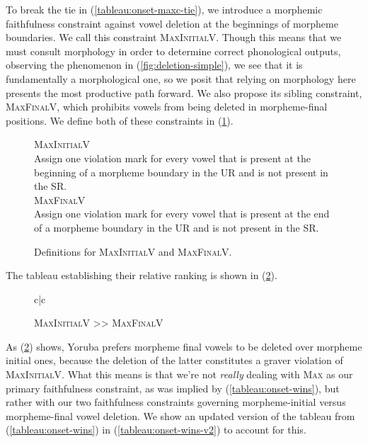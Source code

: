 \documentclass[12pt]{article}
\newcommand{\maxvplus}{\textsc{MaxFinalV}}
\newcommand{\maxplusv}{\textsc{MaxInitialV}}
\newcommand{\maxc}{\textsc{Max}}
\newcommand{\pref}[1]{(\ref{#1})}
\begin{document}
To break the tie in \pref{tableau:onset-maxc-tie}, we introduce a morphemic
faithfulness constraint against vowel deletion at the beginnings of morpheme
boundaries. We call this constraint \maxplusv. Though this means that we must
consult morphology in order to determine correct phonological outputs,
observing the phenomenon in \pref{fig:deletion-simple}, we see that it is
fundamentally a morphological one, so we posit that relying on morphology here
presents the most productive path forward. We also propose its sibling
constraint, \maxvplus, which prohibits vowels from being deleted in
morpheme-final positions. We define both of these constraints in
\pref{def:maxvplus-and-maxplusv}.


\begin{figure}[h]
    \caption{Definitions for \maxplusv{} and \maxvplus.}
    \label{def:maxvplus-and-maxplusv}
    \begin{center}
        \maxplusv\\
        Assign one violation mark for every vowel that is present at the
        beginning of a morpheme boundary in the UR and is not present in the
        SR.\\
        \vspace{1em}
        \maxvplus\\
        Assign one violation mark for every vowel that is present at the end of
        a morpheme boundary in the UR and is not present in the SR.
    \end{center}
\end{figure}

The tableau establishing their relative ranking is shown in
\pref{tableau:maxplusv-wins}.

\begin{figure}[h]
\caption{\maxplusv{} >> \maxvplus}
\label{tableau:maxplusv-wins}
\begin{tableau}{c|c}
        \const{\maxplusv} \const{\maxvplus}
     \vio{}            \vio{*}
               \vio{*!}          \vio{}
\end{tableau}
\end{figure}

As \pref{tableau:maxplusv-wins} shows, Yoruba prefers morpheme final vowels to
be deleted over morpheme initial ones, because the deletion of the latter
constitutes a graver violation of \maxplusv. What this means is that we're not
\textit{really} dealing with \maxc{} as our primary faithfulness constraint, as
was implied by \pref{tableau:onset-wins}, but rather with our two faithfulness
constraints governing morpheme-initial versus morpheme-final vowel deletion. We
show an updated version of the tableau from \pref{tableau:onset-wins} in
\pref{tableau:onset-wins-v2} to account for this.
\end{document}

